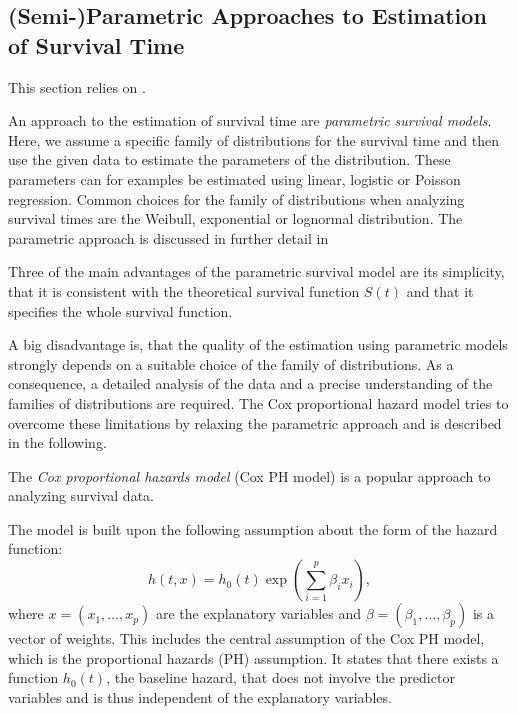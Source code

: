 \documentclass[12pt, a4paper]{scrartcl}
\theoremstyle{definition}
\theoremstyle{plain}
\numberwithin{equation}{section}
\numberwithin{figure}{section}
\numberwithin{table}{section}
\begin{document}
	
	\subsection{(Semi-)Parametric Approaches to Estimation of Survival Time} \label{cox}

	This section relies on \citet*{sabook}.
	
	An approach to the estimation of survival time are \emph{parametric survival models}.
	Here, we assume a specific family of distributions for the survival time and then use the given data to estimate the parameters of the distribution.
	These parameters can for examples be estimated using linear, logistic or Poisson regression.
	Common choices for the family of distributions when analyzing survival times are the Weibull, exponential or lognormal distribution.
	The parametric approach is discussed in further detail in \citet*{sabook}
	
	Three of the main advantages of the parametric survival model are its simplicity,  that it is consistent with the theoretical survival function $S(t)$ and that it specifies the whole survival function.
	
	A big disadvantage is, that the quality of the estimation using parametric models strongly depends on a suitable choice of the family of distributions.
	As a consequence, a detailed analysis of the data and a precise understanding of the families of distributions are required.
	The Cox proportional hazard model tries to overcome these limitations by relaxing the parametric approach and is described in the following.
	
	The \emph{Cox proportional hazards model} (Cox PH model) is a popular approach to analyzing survival data.
	
	The model is built upon the following assumption about the form of the hazard function:
	\begin{equation*}
	h(t,x) = h_0(t) \exp \left(\sum_{i=1}^p \beta_i x_i\right),
	\end{equation*}
	where $x=(x_1,\dots,x_p)$ are the explanatory variables and $\beta = (\beta_1,\dots, \beta_p)$ is a vector of weights.
	This includes the central assumption of the Cox PH model, which is the proportional hazards (PH) assumption.
	It states that there exists a function $h_0(t)$, the baseline hazard, that does not involve the predictor variables and is thus independent of the explanatory variables.
\end{document}
